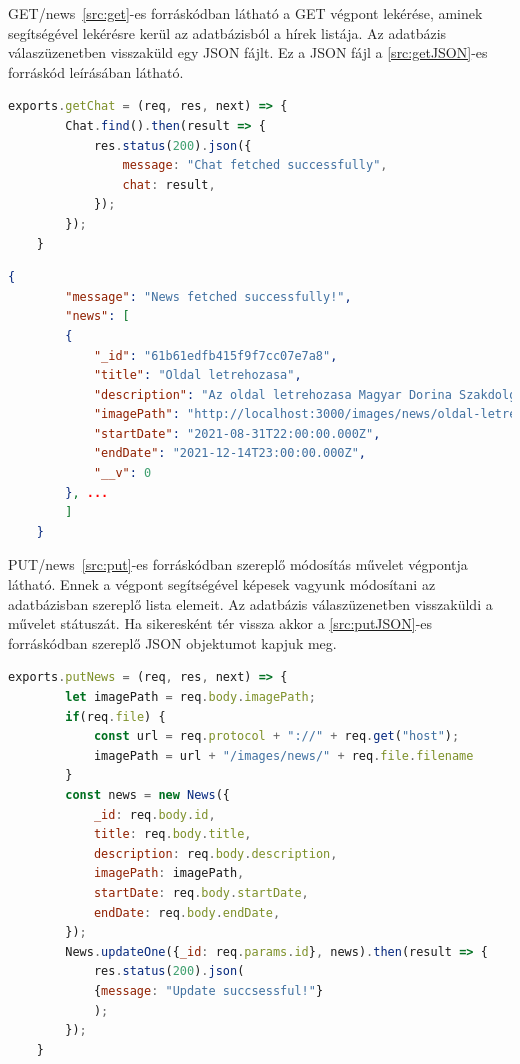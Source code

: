 GET/news~\ref{src:get}-es forráskódban látható a GET végpont lekérése, aminek segítségével lekérésre kerül az adatbázisból a hírek listája. Az adatbázis válaszüzenetben visszaküld egy JSON fájlt. Ez a JSON fájl a \ref{src:getJSON}-es forráskód leírásában látható.

\begin{lstlisting}[language=JavaScript]
	exports.getChat = (req, res, next) => {
		Chat.find().then(result => {
			res.status(200).json({
				message: "Chat fetched successfully",
				chat: result,
			});
		});
	}
\end{lstlisting}

\begin{lstlisting}[language={JSON}]
	{
		"message": "News fetched successfully!",
		"news": [
		{
			"_id": "61b61edfb415f9f7cc07e7a8",
			"title": "Oldal letrehozasa",
			"description": "Az oldal letrehozasa Magyar Dorina Szakdolgozata elkeszitese celjabol tortent. Jelenleg ez az oldal nem uzemel! Nem kerulnek ertekesitesre azok a termekek, amik az aruhazban talalhatoak! Ha tovabbi kerdese lenne a Rolunk feliratu menun keresztul kapcsolatba lephet velem es minden kerdesre email formajaban valaszolok. Megerteseteket elore is koszonom!",
			"imagePath": "http://localhost:3000/images/news/oldal-letrehozasa-1639325407045.png",
			"startDate": "2021-08-31T22:00:00.000Z",
			"endDate": "2021-12-14T23:00:00.000Z",
			"__v": 0
		}, ...
		]
	}
\end{lstlisting}

PUT/news~\ref{src:put}-es forráskódban szereplő módosítás művelet végpontja látható. Ennek a végpont segítségével képesek vagyunk módosítani az adatbázisban szereplő lista elemeit. Az adatbázis válaszüzenetben visszaküldi a művelet státuszát. Ha sikeresként tér vissza akkor a \ref{src:putJSON}-es forráskódban szereplő JSON objektumot kapjuk meg.

\begin{lstlisting}[language=JavaScript]
	exports.putNews = (req, res, next) => {
		let imagePath = req.body.imagePath;
		if(req.file) {
			const url = req.protocol + "://" + req.get("host");
			imagePath = url + "/images/news/" + req.file.filename
		}
		const news = new News({
			_id: req.body.id,
			title: req.body.title,
			description: req.body.description,
			imagePath: imagePath,
			startDate: req.body.startDate,
			endDate: req.body.endDate,
		});
		News.updateOne({_id: req.params.id}, news).then(result => {
			res.status(200).json(
			{message: "Update succsessful!"}
			);
		});
	}
\end{lstlisting}

